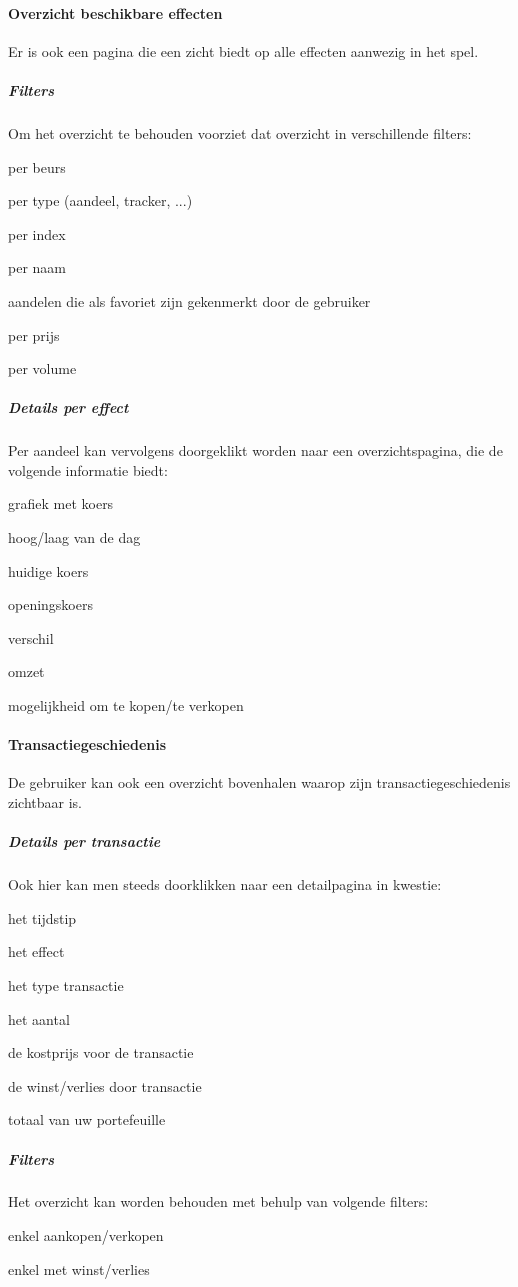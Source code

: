 \paragraph{Overzicht beschikbare effecten}
Er is ook een pagina die een zicht biedt op alle effecten aanwezig in het spel.
\subparagraph{Filters} Om het overzicht te behouden voorziet dat overzicht in verschillende filters:
\begin{itemize_compact}
	\item{per beurs}
	\item{per type (aandeel, tracker, ...)}
	\item{per index}
	\item{per naam}
	\item{aandelen die als favoriet zijn gekenmerkt door de gebruiker}
	\item{per prijs}
	\item{per volume}
\end{itemize_compact}
\subparagraph{Details per effect}Per aandeel kan vervolgens doorgeklikt worden naar een overzichtspagina, die de volgende informatie biedt:
\begin{itemize_compact}
	\item{grafiek met koers}
	\item{hoog/laag van de dag}
	\item{huidige koers}
	\item{openingskoers}
	\item{verschil}
	\item{omzet}
	\item{mogelijkheid om te kopen/te verkopen}
\end{itemize_compact}

\paragraph{Transactiegeschiedenis}De gebruiker kan ook een overzicht bovenhalen waarop zijn transactiegeschiedenis zichtbaar is. 
\subparagraph{Details per transactie}Ook hier kan men steeds doorklikken naar een detailpagina in kwestie:
\begin{itemize_compact}
	\item{het tijdstip}
	\item{het effect}
	\item{het type transactie}
	\item{het aantal}
	\item{de kostprijs voor de transactie}
	\item{de winst/verlies door transactie}
	\item{totaal van uw portefeuille}
\end{itemize_compact}
\subparagraph{Filters}Het overzicht kan worden behouden met behulp van volgende filters:
\begin{itemize_compact}
	\item{enkel aankopen/verkopen}
	\item{enkel met winst/verlies}
\end{itemize_compact}

